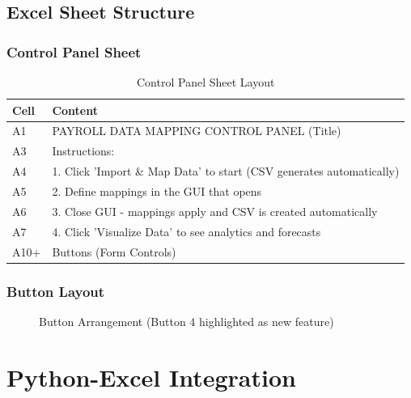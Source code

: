 \subsection{Excel Sheet Structure}

\subsubsection{Control Panel Sheet}

\begin{table}[H]
\centering
\begin{tabular}{|l|p{8cm}|}
\hline
\textbf{Cell} & \textbf{Content} \\
\hline
A1 & PAYROLL DATA MAPPING CONTROL PANEL (Title) \\
A3 & Instructions: \\
A4 & 1. Click 'Import \& Map Data' to start (CSV generates automatically) \\
A5 & 2. Define mappings in the GUI that opens \\
A6 & 3. Close GUI - mappings apply and CSV is created automatically \\
A7 & 4. Click 'Visualize Data' to see analytics and forecasts \\
A10+ & Buttons (Form Controls) \\
\hline
\end{tabular}
\caption{Control Panel Sheet Layout}
\end{table}

\subsubsection{Button Layout}

\begin{figure}[H]
\centering
{}
\caption{Button Arrangement (Button 4 highlighted as new feature)}
\end{figure}

\section{Python-Excel Integration}

